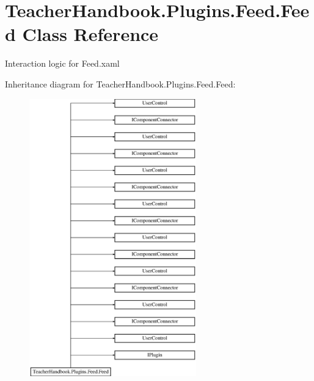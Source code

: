 \hypertarget{class_teacher_handbook_1_1_plugins_1_1_feed_1_1_feed}{}\section{Teacher\+Handbook.\+Plugins.\+Feed.\+Feed Class Reference}
\label{class_teacher_handbook_1_1_plugins_1_1_feed_1_1_feed}


Interaction logic for Feed.\+xaml  


Inheritance diagram for Teacher\+Handbook.\+Plugins.\+Feed.\+Feed\+:\begin{figure}[H]
\begin{center}
\leavevmode
\includegraphics[height=12.000000cm]{d2/d56/class_teacher_handbook_1_1_plugins_1_1_feed_1_1_feed}
\end{center}
\end{figure}
